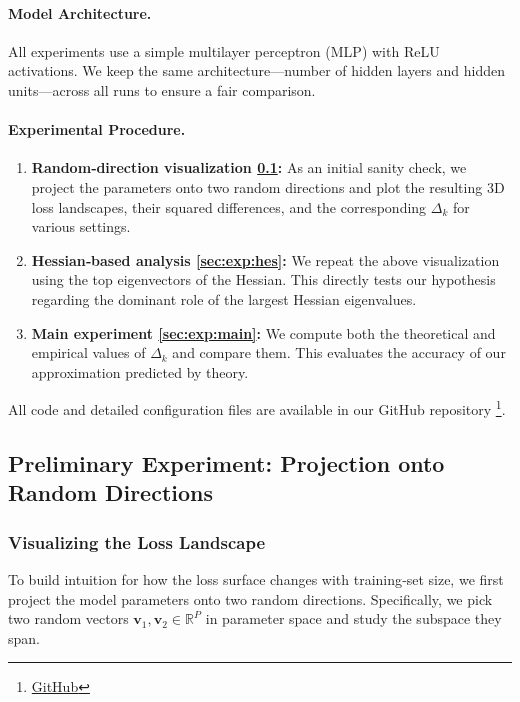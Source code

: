 \documentclass{article}
\begin{document}
\paragraph{Model Architecture.}
All experiments use a simple multilayer perceptron (MLP) with ReLU activations. We keep the same architecture—number of hidden layers
and hidden units—across all runs to ensure a fair comparison.

\paragraph{Experimental Procedure.}
\begin{enumerate}
  \item \textbf{Random‐direction visualization \ref{sec:exp:pre}:} As an initial sanity check, we project the parameters onto two random directions and
        plot the resulting 3D loss landscapes, their squared differences, and the corresponding $\Delta_k$ for various settings.
  \item \textbf{Hessian‐based analysis \ref{sec:exp:hes}:} We repeat the above visualization using the top eigenvectors of the Hessian. This directly
        tests our hypothesis regarding the dominant role of the largest Hessian eigenvalues.
  \item \textbf{Main experiment \ref{sec:exp:main}:} We compute both the theoretical and empirical values of $\Delta_k$ and compare them. This evaluates
        the accuracy of our approximation predicted by theory.
\end{enumerate}

All code and detailed configuration files are available in our GitHub
repository \footnote{\href{https://github.com/intsystems/2025-Project-183}{GitHub}}.
\subsection{Preliminary Experiment: Projection onto Random Directions}\label{sec:exp:pre}
\subsubsection{Visualizing the Loss Landscape}

To build intuition for how the loss surface changes with training‐set size, we first project the model parameters onto two random
directions. Specifically, we pick two random vectors $\mathbf v_1, \mathbf v_2 \in \mathbb R^P$ in parameter space and study the
subspace they span.
\end{document}
